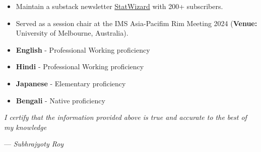 \documentclass[10pt]{developercv} %
\begin{document}

\vspace{-6 pt}
\vspace{-6pt}
\begin{itemize}
    \item Maintain a substack newsletter \href{https://statwizard.substack.com/?showWelcome=true}{StatWizard} with 200+ subscribers.
    \item Served as a session chair at the IMS Asia-Pacifim Rim Meeting 2024 (\textbf{Venue:} University of Melbourne, Australia).
\end{itemize}







\vspace{-6 pt}
\vspace{-6pt}

\begin{minipage}{0.45\textwidth}
    \begin{itemize}[noitemsep]
        \item \textbf{English} - Professional Working proficiency
        \item \textbf{Hindi} - Professional Working proficiency
    \end{itemize}
\end{minipage}
\hfill
\begin{minipage}{0.45\textwidth}
    \begin{itemize}[noitemsep]
        \item \textbf{Japanese} - Elementary proficiency
        \item \textbf{Bengali} - Native proficiency
    \end{itemize}
\end{minipage}



\vspace{1cm}
\textit{I certify that the information provided above is true and accurate to the best of my knowledge}
\begin{flushright}
    --- {\textit{Subhrajyoty Roy}}
\end{flushright}
\end{document}
